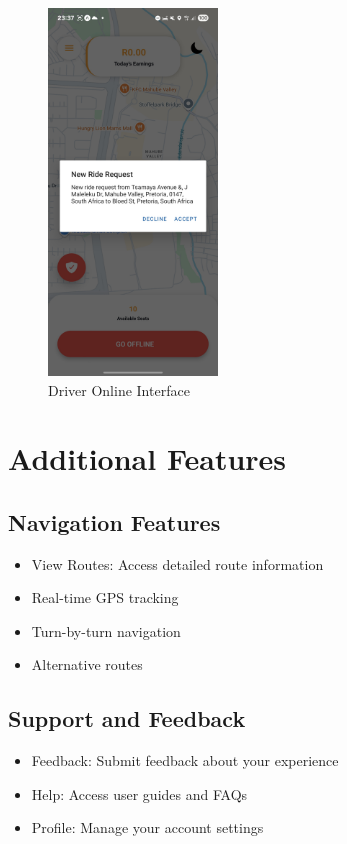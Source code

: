 \documentclass[12pt]{article}
\begin{document}
\begin{figure}[H]
  \centering
  \includegraphics[width=0.4\textwidth]{accept_ride.png}
  \caption{Driver Online Interface}
\end{figure}

\section{Additional Features}

\subsection{Navigation Features}
\begin{itemize}
    \item View Routes: Access detailed route information
    \item Real-time GPS tracking
    \item Turn-by-turn navigation
    \item Alternative routes
\end{itemize}

\subsection{Support and Feedback}
\begin{itemize}
    \item Feedback: Submit feedback about your experience
    \item Help: Access user guides and FAQs
    \item Profile: Manage your account settings
\end{itemize}
\end{document}
